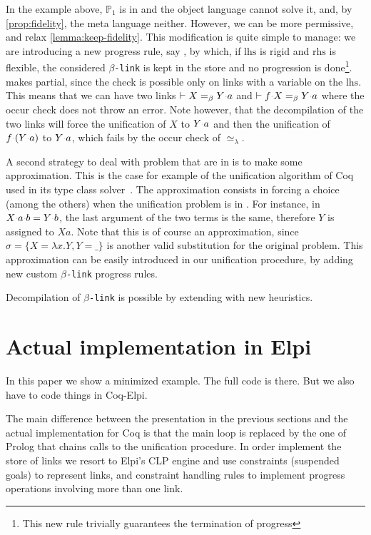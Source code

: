 \documentclass[sigconf,natbib=false,review]{acmart}
\newcommand{\appsep}{\ensuremath{\textcolor{lightgray}{\cdot}}}
\newcommand{\UnifRel}{\ensuremath{\simeq}}
\newcommand{\Ue}{\ensuremath{\UnifRel_\lambda}\xspace}
\newcommand{\linkMacro}[1]{\ensuremath{#1}\texttt{-link}\xspace}
\newcommand{\linkbeta}{\linkMacro{\beta}}
\newcommand{\linkbetaM}[3]{\ensuremath{#1 \vdash #2 =_\beta #3}}
\newcommand{\lhs}{\ensuremath{\mathrm{lhs}}\xspace}
\newcommand{\rhs}{\ensuremath{\mathrm{rhs}}\xspace}
\newcommand{\foUnifPb}{\ensuremath{\mathbb{P}}\xspace}
\begin{document}
In the example above, $\foUnifPb_1$ is in \notllambda and the object language
cannot solve it, and, by \cref{prop:fidelity}, the meta language neither.
However, we can be more permissive, and relax \cref{lemma:keep-fidelity}. This
modification is quite simple to manage: we are introducing a new \notllambda
progress rule, say \progBetaNoLLWait, by which, if \lhs is rigid and \rhs is
flexible, the considered \linkbeta is kept in the store and no progression is
done\footnote{This new rule trivially guarantees the termination of progress}.
\progBetaNoLLWait makes  partial, since the check is
possible only on links with a variable on the \lhs. This means that we can have
two links \linkbetaM{}{X}{Y\appsep a} and \linkbetaM{}{f\appsep X}{Y\appsep a}
where the occur check does not throw an error. Note however, that the
decompilation of the two links will force the unification of $X$ to $Y\appsep a$
and then the unification of $f\appsep (Y \appsep a)$ to $Y\appsep a$, which
fails by the occur check of \Ue.

A second strategy to deal with problem that are in \notllambda is to make some
approximation. This is the case for example of the unification algorithm of Coq
used in its type class solver~\cite{sozeau08}. The approximation consists in
forcing a choice (among the others) when the unification problem is in
\notllambda. For instance, in $X \appsep a \appsep b = Y \appsep b$, the last
argument of the two terms is the same, therefore $Y$ is assigned to $X a$. Note
that this is of course an approximation, since $\sigma = \{X = \lambda x.Y, Y =
\_\}$ is another valid substitution for the original problem. This approximation
can be easily introduced in our unification procedure, by adding new custom 
\linkbeta progress rules.

Decompilation of \linkbeta is possible by extending  with
new heuristics.


\section{Actual implementation in Elpi}\label{sec:implementation}

In this paper we show a minimized example. The full code is there.
But we also have to code things in Coq-Elpi.

The main difference between the presentation in the previous sections and
the actual implementation for Coq is that the main loop \hrun is replaced by
the one of Prolog that chains calls to the unification procedure. In order
implement the store of links we resort to Elpi's CLP engine and
use constraints (suspended goals) to represent links, and constraint
handling rules to implement progress operations involving more than one link.
\end{document}
